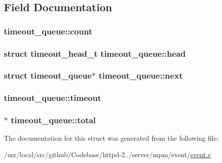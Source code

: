 \subsection{Field Documentation}
\subsubsection[{\texorpdfstring{count}{count}}]{ timeout\+\_\+queue\+::count}\hypertarget{structtimeout__queue_a8ca439df449f64a41bbffb81d0f2d52c}{}\label{structtimeout__queue_a8ca439df449f64a41bbffb81d0f2d52c}
\subsubsection[{\texorpdfstring{head}{head}}]{\setlength{\rightskip}{0pt plus 5cm}struct timeout\+\_\+head\+\_\+t timeout\+\_\+queue\+::head}\hypertarget{structtimeout__queue_a0f585b81356cfec5ce3006c0d8d983b9}{}\label{structtimeout__queue_a0f585b81356cfec5ce3006c0d8d983b9}
\subsubsection[{\texorpdfstring{next}{next}}]{\setlength{\rightskip}{0pt plus 5cm}struct {\bf timeout\+\_\+queue}$\ast$ timeout\+\_\+queue\+::next}\hypertarget{structtimeout__queue_a05b525e4ecf43f704af89458a7913873}{}\label{structtimeout__queue_a05b525e4ecf43f704af89458a7913873}
\subsubsection[{\texorpdfstring{timeout}{timeout}}]{ timeout\+\_\+queue\+::timeout}\hypertarget{structtimeout__queue_a79a70b45268ddbe1c34691d3c1d6bce3}{}\label{structtimeout__queue_a79a70b45268ddbe1c34691d3c1d6bce3}
\subsubsection[{\texorpdfstring{total}{total}}]{$\ast$ timeout\+\_\+queue\+::total}\hypertarget{structtimeout__queue_a3dbf4a48f15888f486450af264c03405}{}\label{structtimeout__queue_a3dbf4a48f15888f486450af264c03405}


The documentation for this struct was generated from the following file\+:\begin{DoxyCompactItemize}
\item 
/usr/local/src/github/\+Codebase/httpd-\/2../server/mpm/event/\hyperlink{event_8c}{event.\+c}\end{DoxyCompactItemize}
